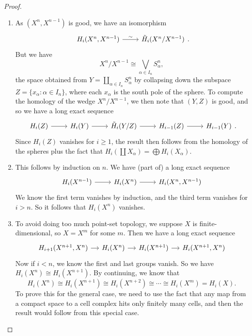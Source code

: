 \documentclass[a4paper]{article}
\theoremstyle{definition}
\begin{document}
\begin{proof}\leavevmode
  \begin{enumerate}
    \item As $(X^n, X^{n - 1})$ is good, we have an isomorphism
      \[
        \begin{tikzcd}
          H_i(X^n, X^{n - 1}) \ar[r, "\sim"] & \tilde{H}_i(X^n/X^{n - 1})
        \end{tikzcd}.
      \]
      But we have
      \[
        X^n/X^{n - 1} \cong \bigvee_{\alpha \in I_n} S_\alpha^n,
      \]
      the space obtained from $Y = \coprod_{\alpha \in I_n}S_\alpha^n$ by collapsing down the subspace $Z = \{x_\alpha: \alpha \in I_n\}$, where each $x_\alpha$ is the south pole of the sphere. To compute the homology of the wedge $X^n/X^{n - 1}$, we then note that $(Y, Z)$ is good, and so we have a long exact sequence
      \[
        \begin{tikzcd}
          H_i(Z) \ar[r] & H_i(Y) \ar[r] & \tilde{H}_i(Y/Z) \ar[r] & H_{i - 1}(Z) \ar[r] & H_{i - 1}(Y)
        \end{tikzcd}.
      \]
      Since $H_i(Z)$ vanishes for $i \geq 1$, the result then follows from the homology of the spheres plus the fact that $H_i(\coprod X_\alpha) = \bigoplus H_i(X_\alpha)$.
    \item This follows by induction on $n$. We have (part of) a long exact sequence
      \[
        \begin{tikzcd}
          H_i(X^{n - 1}) \ar[r] & H_i(X^n) \ar[r] & H_i(X^n, X^{n - 1})
        \end{tikzcd}
      \]
      We know the first term vanishes by induction, and the third term vanishes for $i > n$. So it follows that $H_i(X^n)$ vanishes.
    \item To avoid doing too much point-set topology, we suppose $X$ is finite-dimensional, so $X = X^m$ for some $m$. Then we have a long exact sequence
      \[
        \begin{tikzcd}[column sep=small]
          H_{i + 1} (X^{n + 1}, X^n) \ar[r] & H_i(X^n) \ar[r] & H_i(X^{n + 1}) \ar[r] & H_i(X^{n + 1}, X^n)
        \end{tikzcd}
      \]
      Now if $i < n$, we know the first and last groups vanish. So we have $H_i(X^n) \cong H_i(X^{n + 1})$. By continuing, we know that
      \[
        H_i(X^n) \cong H_i(X^{n + 1}) \cong H_i(X^{n + 2}) \cong \cdots \cong H_i(X^m) = H_i(X).
      \]
      To prove this for the general case, we need to use the fact that any map from a compact space to a cell complex hits only finitely many cells, and then the result would follow from this special case.\qedhere
  \end{enumerate}
\end{proof}
\end{document}
